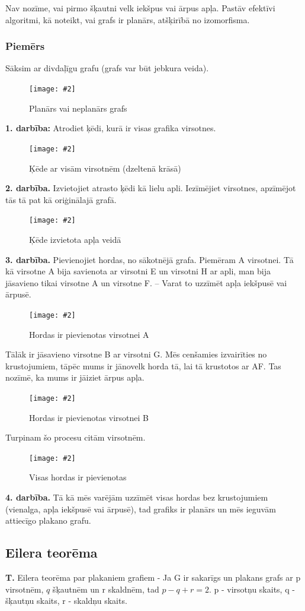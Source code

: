 \documentclass{article}
\newcommand{\illustration}[3]{
	\begin{figure}[H]
		\centering	
		\texttt{[image: \#2]}
		\caption{#3}
	\end{figure}
}
\begin{document}
Nav nozīme, vai pirmo šķautni velk iekšpus vai ārpus apļa.  Pastāv efektīvi algoritmi, kā noteikt, vai grafs ir planārs, atšķirībā no izomorfisma.

\subsubsection{Piemērs}

Sāksim ar divdaļīgu grafu (grafs var būt jebkura veida). 
\illustration{0.5}{circle_chord_method-1}{Planārs vai neplanārs grafs }
	
\textbf{1. darbība:} Atrodiet ķēdi, kurā ir visas grafika virsotnes. 

\illustration{0.5}{circle_chord_method-2}{Ķēde ar visām virsotnēm (dzeltenā krāsā) }

\textbf{2. darbība.} Izvietojiet atrasto ķēdi kā lielu apli. Iezīmējiet virsotnes, apzīmējot tās tā pat kā oriģinālajā grafā. 

\illustration{0.5}{circle_chord_method-3}{Ķēde izvietota apļa veidā}

\textbf{3. darbība.} Pievienojiet hordas, no sākotnējā grafa.  Piemēram A virsotnei. Tā kā virsotne A bija savienota ar virsotni E un virsotni H ar apli, man bija jāsavieno tikai virsotne A un virsotne F. – Varat to uzzīmēt apļa iekšpusē vai ārpusē.


\illustration{0.5}{circle_chord_method-4}{Hordas ir pievienotas virsotnei A}

Tālāk ir jāsavieno virsotne B ar virsotni G. Mēs cenšamies izvairīties no krustojumiem, tāpēc mums ir jānovelk horda tā, lai tā krustotos ar AF.  Tas nozīmē, ka mums ir jāiziet ārpus apļa.

\illustration{0.5}{circle_chord_method-6}{Hordas ir pievienotas virsotnei B}

Turpinam šo procesu citām virsotnēm.

\illustration{0.5}{circle_chord_method-7}{Visas hordas ir pievienotas}

\textbf{4. darbība.} Tā kā mēs varējām uzzīmēt visas hordas bez krustojumiem (vienalga, apļa iekšpusē vai ārpusē), tad grafiks ir planārs un mēs ieguvām attiecīgo plakano grafu.

\subsection{Eilera teorēma}

\textbf{T.} Eilera teorēma par plakaniem grafiem - Ja G ir sakarīgs un plakans grafs ar p virsotnēm, $q$ šķautnēm un r skaldnēm, tad $p − q + r = 2$.  p - virsotņu skaits, q - šķautņu skaits, r - skaldņu skaits.
\end{document}
